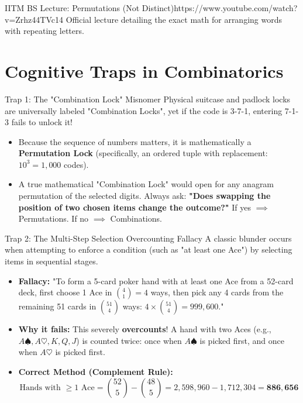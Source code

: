 \begin{videocard}{IITM BS Lecture: Permutations (Not Distinct)}{https://www.youtube.com/watch?v=Zrhz44TVc14}
Official lecture detailing the exact math for arranging words with repeating letters.
\end{videocard}

\section{Cognitive Traps in Combinatorics}

\begin{trapbox}{Trap 1: The "Combination Lock" Misnomer}
Physical suitcase and padlock locks are universally labeled "Combination Locks", yet if the code is 3-7-1, entering 7-1-3 fails to unlock it!
\begin{itemize}
    \item Because the sequence of numbers matters, it is mathematically a \textbf{Permutation Lock} (specifically, an ordered tuple with replacement: $10^3 = 1{,}000$ codes).
    \item A true mathematical "Combination Lock" would open for any anagram permutation of the selected digits. Always ask: \textbf{"Does swapping the position of two chosen items change the outcome?"} If yes $\implies$ Permutations. If no $\implies$ Combinations.
\end{itemize}
\end{trapbox}

\begin{trapbox}{Trap 2: The Multi-Step Selection Overcounting Fallacy}
A classic blunder occurs when attempting to enforce a condition (such as "at least one Ace") by selecting items in sequential stages.
\begin{itemize}
    \item \textbf{Fallacy:} "To form a 5-card poker hand with at least one Ace from a 52-card deck, first choose 1 Ace in $\binom{4}{1} = 4$ ways, then pick any 4 cards from the remaining 51 cards in $\binom{51}{4}$ ways: $4 \times \binom{51}{4} = 999{,}600$."
    \item \textbf{Why it fails:} This severely \textbf{overcounts}! A hand with two Aces (e.g., $A\spadesuit, A\heartsuit, K, Q, J$) is counted twice: once when $A\spadesuit$ is picked first, and once when $A\heartsuit$ is picked first.
    \item \textbf{Correct Method (Complement Rule):}
    $$\text{Hands with } \ge 1 \text{ Ace} = \binom{52}{5} - \binom{48}{5} = 2{,}598{,}960 - 1{,}712{,}304 = \mathbf{886{,}656}$$
\end{itemize}
\end{trapbox}

